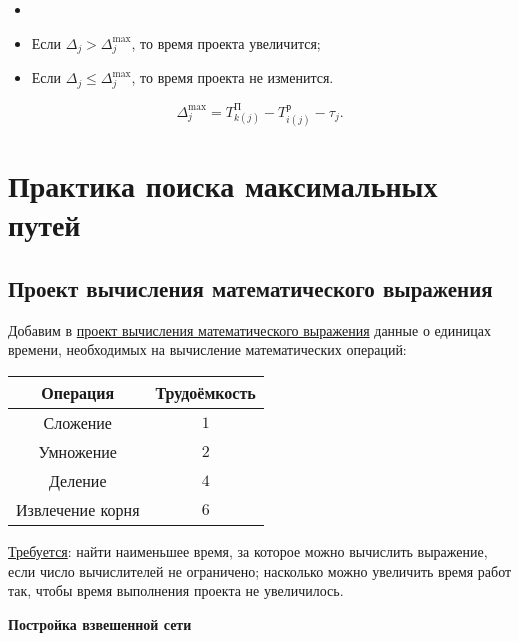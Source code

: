 \implication

\begin{itemize}[nosep]
	\item[]
	
	\item Если $\Delta_j > \Delta_j^{\max}$, то время проекта увеличится;
	
	\item Если $\Delta_j \le \Delta_j^{\max}$, то время проекта не изменится.
\end{itemize}

\implication

\[
\Delta_j^{\max} = T_{k(j)}^{\text{П}} - T_{i(j)}^{\text{р}} - \tau_j.
\]

\section{Практика поиска максимальных путей}

\subsection{Проект вычисления математического выражения}

\label{pr:math_expr_calc_time}

Добавим в \hyperref[proj:math_expr_calc_project]{проект вычисления математического выражения} данные о единицах времени, необходимых на вычисление математических операций:

\begin{table}[H]
	\centering
	\begin{tabular}{ | c | c | } 
		\hline
		Операция & Трудоёмкость \\ \hline
		Сложение & $1$ \\ \hline
		Умножение & $2$ \\ \hline
		Деление & $4$ \\ \hline
		Извлечение корня & $6$ \\ \hline
	\end{tabular}
\end{table}

\underline{Требуется}: найти наименьшее время, за которое можно вычислить выражение, если число вычислителей не ограничено; насколько можно увеличить время работ так, чтобы время выполнения проекта не увеличилось.

\solution

\textbf{Постройка взвешенной сети}

